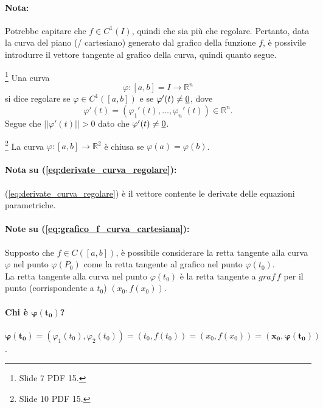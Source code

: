 \paragraph{Nota:} Potrebbe capitare che $f\in C^1(I)$, quindi che sia più che regolare. Pertanto, data la curva del piano (/ cartesiano) generato dal grafico della funzione $f$, è possivile introdurre il vettore tangente al grafico della curva, quindi quanto segue.

\begin{definition}\footnote{Slide 7 PDF 15.}
	Una curva 
	\begin{equation}\label{eq:curva_regolare}
		\varphi:[a,b]=I\rightarrow\mathbb{R}^n
	\end{equation}
	si dice regolare se $\varphi\in C^1([a,b])$ e se $\varphi'(t)\neq\uline 0$, dove
	\begin{equation}\label{eq:derivate_curva_regolare}
		\varphi'(t)=(\varphi_1'(t), \hdots, \varphi_n'(t))\in\mathbb{R}^n.
	\end{equation}
	Segue che $||\varphi'(t)||>0$ dato che $\varphi'(t)\neq\uline 0$.
\end{definition}

\begin{definition}\footnote{Slide 10 PDF 15.}
	La curva $\varphi:[a,b]\rightarrow\mathbb{R}^2$ è chiusa se $\varphi(a) = \varphi(b)$.
\end{definition}

\paragraph{Nota su (\ref{eq:derivate_curva_regolare}):} (\ref{eq:derivate_curva_regolare}) è il vettore contente le derivate delle equazioni parametriche.

\paragraph{Note su (\ref{eq:grafico_f_curva_cartesiana}):} Supposto che $f\in C([a,b])$, è possibile considerare la retta tangente alla curva $\varphi$ nel punto $\varphi(P_0)$ come la retta tangente al grafico nel punto $\varphi(t_0)$.\\
La retta tangente alla curva nel punto $\varphi(t_0)$ è la retta tangente a $graf\, f$ per il punto (corrispondente a $t_0$) $(x_0, f(x_0))$.

\paragraph{Chi è $\boldsymbol{\varphi(t_0)}$?} $\boldsymbol{\varphi(t_0)=}(\varphi_1(t_0), \varphi_2(t_0)) = (t_0, f(t_0)) = (x_0, f(x_0))=\boldsymbol{(x_0,\varphi(t_0))}$.

